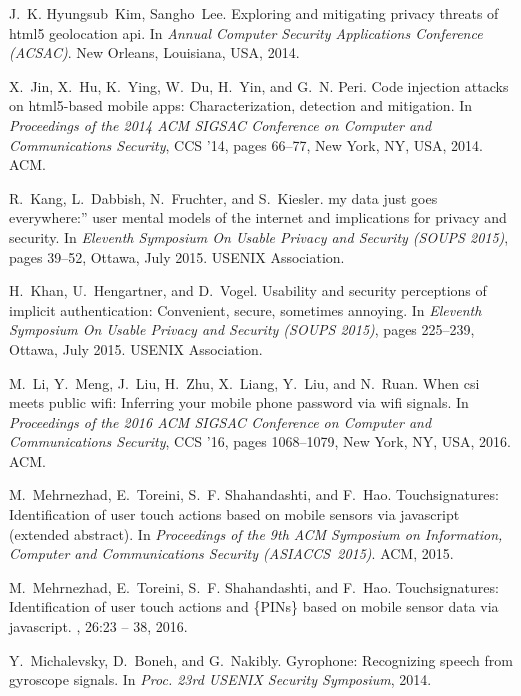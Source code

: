 \documentclass[10pt,twocolumn]{article}
\begin{document}
\begin{thebibliography}{10}
J.~K. Hyungsub~Kim, Sangho~Lee.
\newblock Exploring and mitigating privacy threats of html5 geolocation api.
\newblock In {\em Annual Computer Security Applications Conference (ACSAC)}.
  New Orleans, Louisiana, USA, 2014.

X.~Jin, X.~Hu, K.~Ying, W.~Du, H.~Yin, and G.~N. Peri.
\newblock Code injection attacks on html5-based mobile apps: Characterization,
  detection and mitigation.
\newblock In {\em Proceedings of the 2014 ACM SIGSAC Conference on Computer and
  Communications Security}, CCS '14, pages 66--77, New York, NY, USA, 2014.
  ACM.

R.~Kang, L.~Dabbish, N.~Fruchter, and S.~Kiesler.
\newblock {\textquotedblleft}my data just goes everywhere:{\textquotedblright}
  user mental models of the internet and implications for privacy and security.
\newblock In {\em Eleventh Symposium On Usable Privacy and Security (SOUPS
  2015)}, pages 39--52, Ottawa, July 2015. USENIX Association.

H.~Khan, U.~Hengartner, and D.~Vogel.
\newblock Usability and security perceptions of implicit authentication:
  Convenient, secure, sometimes annoying.
\newblock In {\em Eleventh Symposium On Usable Privacy and Security (SOUPS
  2015)}, pages 225--239, Ottawa, July 2015. USENIX Association.

M.~Li, Y.~Meng, J.~Liu, H.~Zhu, X.~Liang, Y.~Liu, and N.~Ruan.
\newblock When csi meets public wifi: Inferring your mobile phone password via
  wifi signals.
\newblock In {\em Proceedings of the 2016 ACM SIGSAC Conference on Computer and
  Communications Security}, CCS '16, pages 1068--1079, New York, NY, USA, 2016.
  ACM.

M.~Mehrnezhad, E.~Toreini, S.~F. Shahandashti, and F.~Hao.
\newblock Touchsignatures: Identification of user touch actions based on mobile
  sensors via javascript (extended abstract).
\newblock In {\em Proceedings of the 9th ACM Symposium on Information, Computer
  and Communications Security (ASIACCS~2015)}. ACM, 2015.

M.~Mehrnezhad, E.~Toreini, S.~F. Shahandashti, and F.~Hao.
\newblock Touchsignatures: Identification of user touch actions and \{PINs\}
  based on mobile sensor data via javascript.
, 26:23 -- 38,
  2016.

Y.~Michalevsky, D.~Boneh, and G.~Nakibly.
\newblock Gyrophone: Recognizing speech from gyroscope signals.
\newblock In {\em Proc. 23rd USENIX Security Symposium}, 2014.


\end{thebibliography}
\end{document}
